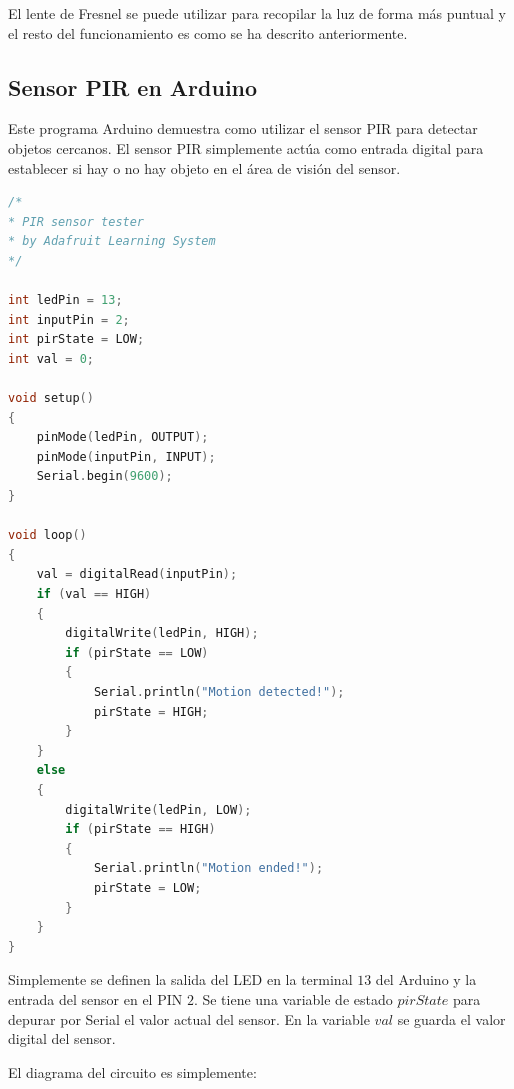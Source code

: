 \documentclass[conference]{IEEEtran}
\begin{document}
    El lente de Fresnel se puede utilizar para recopilar la luz de forma más puntual y el resto del funcionamiento es como se ha descrito anteriormente.

    \subsection{Sensor PIR en Arduino}\label{subsec:sensor-pir-en-arduino}

    Este programa Arduino demuestra como utilizar el sensor PIR para detectar objetos cercanos. El sensor PIR simplemente actúa como entrada digital para establecer si hay o no hay objeto en el área de visión del sensor.

    \begin{lstlisting}[language=C, caption=Sensor PIR en Arduino. Fuente: Adafruit Learning System $\mid$ PIR Motion Sensor \cite{adafruit-learning-system-pir-sensor-2014A}]
/*
* PIR sensor tester
* by Adafruit Learning System
*/

int ledPin = 13;
int inputPin = 2;
int pirState = LOW;
int val = 0;

void setup()
{
    pinMode(ledPin, OUTPUT);
    pinMode(inputPin, INPUT);
    Serial.begin(9600);
}

void loop()
{
    val = digitalRead(inputPin);
    if (val == HIGH)
    {
        digitalWrite(ledPin, HIGH);
        if (pirState == LOW)
        {
            Serial.println("Motion detected!");
            pirState = HIGH;
        }
    }
    else
    {
        digitalWrite(ledPin, LOW);
        if (pirState == HIGH)
        {
            Serial.println("Motion ended!");
            pirState = LOW;
        }
    }
}
\end{lstlisting}

\bigbreak

Simplemente se definen la salida del LED en la terminal $13$ del Arduino y la entrada del sensor en el PIN $2$. Se tiene una variable de estado $pirState$ para depurar por Serial el valor actual del sensor. En la variable $val$ se guarda el valor digital del sensor.

\bigbreak

El diagrama del circuito es simplemente:
\end{document}
